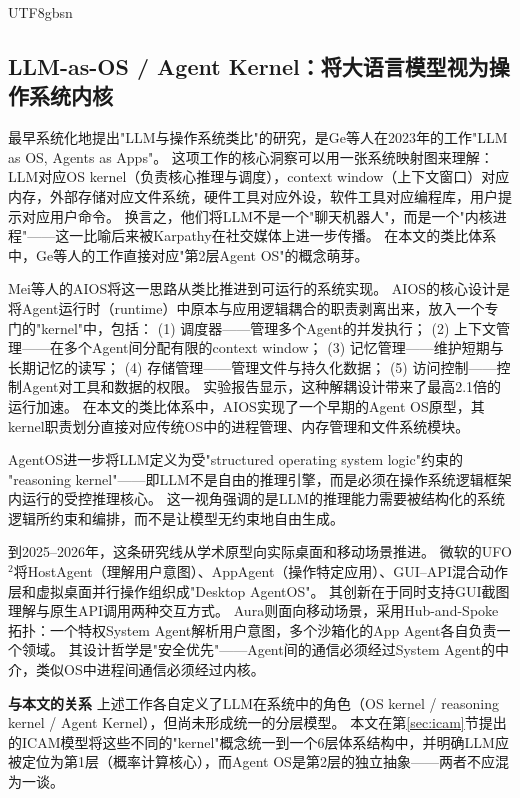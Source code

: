 \documentclass[11pt,a4paper]{article}
\begin{document}
\begin{CJK*}{UTF8}{gbsn}
\subsection{LLM-as-OS / Agent Kernel：将大语言模型视为操作系统内核}
\label{sec:related-llmos}

最早系统化地提出"LLM与操作系统类比"的研究，是Ge等人在2023年的工作"LLM as OS, Agents as Apps"\cite{ge2023llmos}。
这项工作的核心洞察可以用一张系统映射图来理解：LLM对应OS kernel（负责核心推理与调度），context window（上下文窗口）对应内存，外部存储对应文件系统，硬件工具对应外设，软件工具对应编程库，用户提示对应用户命令。
换言之，他们将LLM不是一个"聊天机器人"，而是一个"内核进程"——这一比喻后来被Karpathy在社交媒体上进一步传播\cite{karpathy2023llmos}。
在本文的类比体系中，Ge等人的工作直接对应"第2层Agent OS"的概念萌芽。

Mei等人的AIOS\cite{mei2024aios}将这一思路从类比推进到可运行的系统实现。
AIOS的核心设计是将Agent运行时（runtime）中原本与应用逻辑耦合的职责剥离出来，放入一个专门的"kernel"中，包括：
(1) 调度器——管理多个Agent的并发执行；
(2) 上下文管理——在多个Agent间分配有限的context window；
(3) 记忆管理——维护短期与长期记忆的读写；
(4) 存储管理——管理文件与持久化数据；
(5) 访问控制——控制Agent对工具和数据的权限。
实验报告显示，这种解耦设计带来了最高2.1倍的运行加速。
在本文的类比体系中，AIOS实现了一个早期的Agent OS原型，其kernel职责划分直接对应传统OS中的进程管理、内存管理和文件系统模块。

AgentOS\cite{agentos2025}进一步将LLM定义为受"structured operating system logic"约束的%
"reasoning kernel"——即LLM不是自由的推理引擎，而是必须在操作系统逻辑框架内运行的受控推理核心。
这一视角强调的是LLM的推理能力需要被结构化的系统逻辑所约束和编排，而不是让模型无约束地自由生成。

到2025--2026年，这条研究线从学术原型向实际桌面和移动场景推进。
微软的UFO$^2$\cite{ufo2_2025}将HostAgent（理解用户意图）、AppAgent（操作特定应用）、GUI--API混合动作层和虚拟桌面并行操作组织成"Desktop AgentOS"。
其创新在于同时支持GUI截图理解与原生API调用两种交互方式。
Aura\cite{aura2025}则面向移动场景，采用Hub-and-Spoke拓扑：一个特权System Agent解析用户意图，多个沙箱化的App Agent各自负责一个领域。
其设计哲学是"安全优先"——Agent间的通信必须经过System Agent的中介，类似OS中进程间通信必须经过内核。

\textbf{与本文的关系}
上述工作各自定义了LLM在系统中的角色（OS kernel / reasoning kernel / Agent Kernel），但尚未形成统一的分层模型。
本文在第\ref{sec:icam}节提出的ICAM模型将这些不同的"kernel"概念统一到一个6层体系结构中，并明确LLM应被定位为第1层（概率计算核心），而Agent OS是第2层的独立抽象——两者不应混为一谈。


\end{CJK*}
\end{document}
